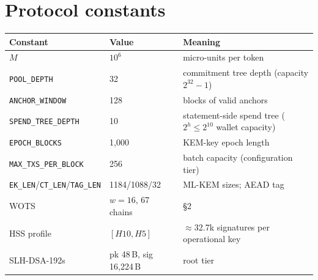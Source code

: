\documentclass[10pt]{article}
\newcommand{\ct}[1]{\texttt{#1}}
\begin{document}
\section{Protocol constants}
\begin{center}\small
\begin{tabular}{@{}lll@{}}
\toprule
Constant & Value & Meaning \\
\midrule
$M$ & $10^6$ & micro-units per token \\
\ct{POOL\_DEPTH} & 32 & commitment tree depth (capacity $2^{32}{-}1$) \\
\ct{ANCHOR\_WINDOW} & 128 & blocks of valid anchors \\
\ct{SPEND\_TREE\_DEPTH} & 10 & statement-side spend tree ($2^h \le 2^{10}$ wallet capacity) \\
\ct{EPOCH\_BLOCKS} & 1{,}000 & KEM-key epoch length \\
\ct{MAX\_TXS\_PER\_BLOCK} & 256 & batch capacity (configuration tier) \\
\ct{EK\_LEN}/\ct{CT\_LEN}/\ct{TAG\_LEN} & 1184/1088/32 & ML-KEM sizes; AEAD tag \\
WOTS & $w{=}16$, 67 chains & \S2 \\
HSS profile & $[H10,H5]$ & $\approx$32.7k signatures per operational key \\
SLH-DSA-192s & pk 48\,B, sig 16{,}224\,B & root tier \\
\bottomrule
\end{tabular}
\end{center}
\end{document}
